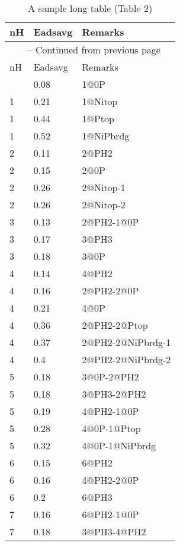 
\clearpage
\begin{center}
\centering
\begin{longtable}{|l|l|l|}
\caption{A sample long table (Table 2)}
\label{tab:long2} \\
\hline
nH & Eadsavg & Remarks \\ \hline
\endfirsthead

\multicolumn{3}{c}{\tablename\ \thetable{} -- Continued from previous page} \\ \hline
nH & Eadsavg & Remarks \\ \hline
\endhead

\hline
\endfoot

\hline
\endlastfoot
1 & 0.08 & 1@0P \\ \hline
1 & 0.21 & 1@Nitop \\ \hline
1 & 0.44 & 1@Ptop \\ \hline
1 & 0.52 & 1@NiPbrdg \\ \hline
2 & 0.11 & 2@PH2 \\ \hline
2 & 0.15 & 2@0P \\ \hline
2 & 0.26 & 2@Nitop-1 \\ \hline
2 & 0.26 & 2@Nitop-2 \\ \hline
3 & 0.13 & 2@PH2-1@0P \\ \hline
3 & 0.17 & 3@PH3 \\ \hline
3 & 0.18 & 3@0P \\ \hline
4 & 0.14 & 4@PH2 \\ \hline
4 & 0.16 & 2@PH2-2@0P \\ \hline
4 & 0.21 & 4@0P \\ \hline
4 & 0.36 & 2@PH2-2@Ptop \\ \hline
4 & 0.37 & 2@PH2-2@NiPbrdg-1 \\ \hline
4 & 0.4 & 2@PH2-2@NiPbrdg-2 \\ \hline
5 & 0.18 & 3@0P-2@PH2 \\ \hline
5 & 0.18 & 3@PH3-2@PH2 \\ \hline
5 & 0.19 & 4@PH2-1@0P \\ \hline
5 & 0.28 & 4@0P-1@Ptop \\ \hline
5 & 0.32 & 4@0P-1@NiPbrdg \\ \hline
6 & 0.15 & 6@PH2 \\ \hline
6 & 0.16 & 4@PH2-2@0P \\ \hline
6 & 0.2 & 6@PH3 \\ \hline
7 & 0.16 & 6@PH2-1@0P \\ \hline
7 & 0.18 & 3@PH3-4@PH2 \\ \hline

\end{longtable}
\end{center}
